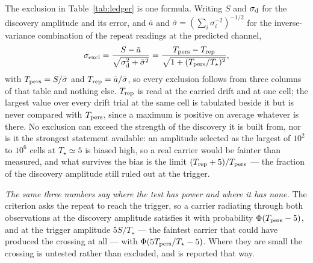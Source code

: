 The exclusion in Table~\ref{tab:ledger} is one formula. Writing $S$ and
$\sigma_{\rm d}$ for the discovery amplitude and its error, and $\bar{a}$ and
$\bar{\sigma}=(\sum_i\sigma_i^{-2})^{-1/2}$ for the inverse-variance
combination of the repeat readings at the predicted channel,
\begin{equation}
\sigma_{\rm excl}=\frac{S-\bar{a}}
{\sqrt{\sigma_{\rm d}^{2}+\bar{\sigma}^{2}}}
=\frac{T_{\rm pers}-T_{\rm rep}}{\sqrt{1+(T_{\rm pers}/T_\star)^{2}}},
\label{eq:excl}
\end{equation}
with $T_{\rm pers}=S/\bar{\sigma}$ and $T_{\rm rep}=\bar{a}/\bar{\sigma}$, so
every exclusion follows from three columns of that table and nothing else.
$T_{\rm rep}$ is read at the carried drift and at one cell; the largest value
over every drift trial at the same cell is tabulated beside it but is never
compared with $T_{\rm pers}$, since a maximum is positive on average whatever
is there. No exclusion can exceed the strength of the discovery it is built
from, nor is it the strongest statement available: an amplitude selected as
the largest of $10^{2}$ to $10^{6}$ cells at $T_\star\simeq5$ is biased high,
so a real carrier would be fainter than measured, and what survives the bias
is the limit $(T_{\rm rep}+5)/T_{\rm pers}$ --- the fraction of the discovery
amplitude still ruled out at the trigger.

\emph{The same three numbers say where the test has power and where it has
none.} The criterion asks the repeat to reach the trigger, so a carrier
radiating through both observations at the discovery amplitude satisfies it
with probability $\Phi(T_{\rm pers}-5)$, and at the trigger amplitude
$5S/T_\star$ --- the faintest carrier that could have produced the crossing
at all --- with $\Phi(5T_{\rm pers}/T_\star-5)$. Where they are small the
crossing is untested rather than excluded, and is reported that way.

